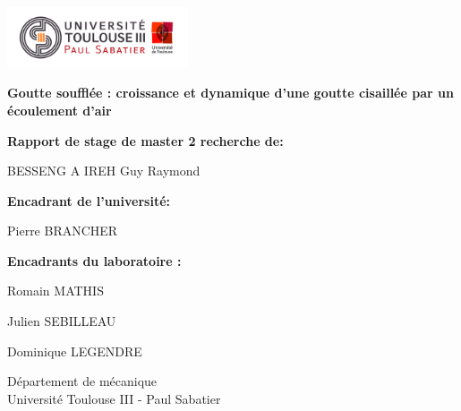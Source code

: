 \begin{titlepage}
  \includegraphics[width=0.4\textwidth]{./image/Logo_UT3.jpg}
    \begin{center}



      \LARGE
      \textbf{Goutte soufflée : croissance et dynamique d'une goutte cisaillée par un écoulement d'air }


        \vspace{1.5cm}
        \textbf{Rapport de stage de master 2 recherche de:}
        
        BESSENG A IREH Guy Raymond

        \vspace{0.8cm}
        \textbf{Encadrant de l'université:}

        Pierre BRANCHER

        \vspace{0.8cm}
        \textbf{Encadrants du laboratoire :}

        Romain MATHIS

        Julien SEBILLEAU

        Dominique LEGENDRE




        \vfill

        
        \Large
        Département de mécanique\\
        Université Toulouse III - Paul Sabatier\\
        \date{}

    \end{center}
\end{titlepage}

